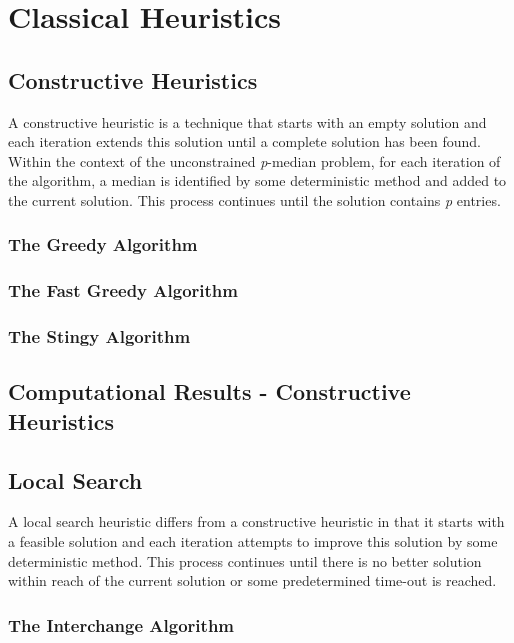 \documentclass[11pt]{article}
\begin{document}
	\section{Classical Heuristics}
	\subsection{Constructive Heuristics}
	A constructive heuristic is a technique that starts with an empty solution and each iteration extends this solution until a complete solution has been found.  Within the context of the unconstrained \emph{p}-median problem, for each iteration of the algorithm, a median is identified by some deterministic method and added to the current solution.  This process continues until the solution contains \emph{p} entries.
	
	\subsubsection{The Greedy Algorithm}
	
	
	\subsubsection{The Fast Greedy Algorithm}
	
	
	\subsubsection{The Stingy Algorithm}
	
	
	\subsection{Computational Results - Constructive Heuristics}
	
	
	\subsection{Local Search}
	A local search heuristic differs from a constructive heuristic in that it starts with a feasible solution and each iteration attempts to improve this solution by some deterministic method.  This process continues until there is no better solution within reach of the current solution or some predetermined time-out is reached.
	
	\subsubsection{The Interchange Algorithm}
	
\end{document}
